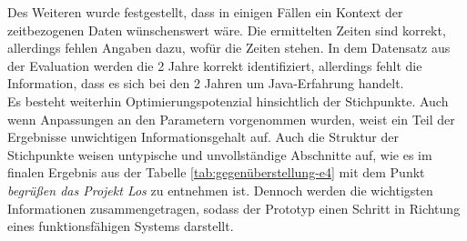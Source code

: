 Des Weiteren wurde festgestellt, dass in einigen Fällen ein Kontext der zeitbezogenen Daten wünschenswert wäre. Die ermittelten Zeiten sind korrekt, allerdings fehlen Angaben dazu, wofür die Zeiten stehen. In dem Datensatz aus der Evaluation werden die 2 Jahre korrekt identifiziert, allerdings fehlt die Information, dass es sich bei den 2 Jahren um Java-Erfahrung handelt.\\

Es besteht weiterhin Optimierungspotenzial hinsichtlich der Stichpunkte. Auch wenn Anpassungen an den Parametern vorgenommen wurden, weist ein Teil der Ergebnisse unwichtigen Informationsgehalt auf. Auch die Struktur der Stichpunkte weisen untypische und unvollständige Abschnitte auf, wie es im finalen Ergebnis aus der Tabelle \ref{tab:gegenüberstellung-e4} mit dem Punkt \emph{begrüßen das Projekt Los} zu entnehmen ist. Dennoch werden die wichtigsten Informationen zusammengetragen, sodass der Prototyp einen Schritt in Richtung eines funktionsfähigen Systems darstellt.
\newpage
